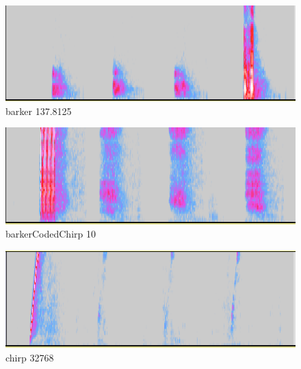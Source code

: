 \begin{figure}[p]
  \centering
  \includegraphics[clip,width=1.05\hsize]{img/barker_137-8125.png}
  \caption{barker 137.8125}\label{fig:barkerZ137Z8125}
\end{figure}

\begin{figure}[p]
  \centering
  \includegraphics[clip,width=1.05\hsize]{img/barkerCodedChirp_10.png}
  \caption{barkerCodedChirp 10}\label{fig:barkerCodedChirpZ10}
\end{figure}

\begin{figure}[p]
  \centering
  \includegraphics[clip,width=1.05\hsize]{img/chirp_32768.png}
  \caption{chirp 32768}\label{fig:chirpZ32768}
\end{figure}



\clearpage





